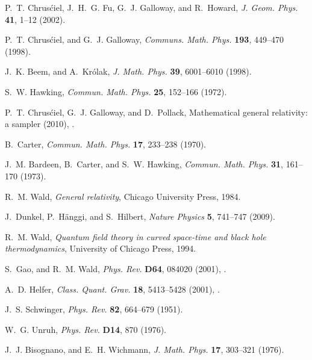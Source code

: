 \documentclass[
%
draft    %
,numberedheadings 
,bibliocites
  ]
  {aipproc}
\begin{document}
\begin{thebibliography}{57}
P.~T. Chrus\'ciel, J.~H.~G. Fu, G.~J. Galloway, and R.~Howard, \emph{J. Geom.
  Phys.} \textbf{41}, 1--12 (2002).

P.~T. Chrus\'ciel, and G.~J. Galloway, \emph{Communs. Math. Phys.}
  \textbf{193}, 449--470 (1998).

J.~K. Beem, and A.~Kr\'olak, \emph{J. Math. Phys.} \textbf{39}, 6001--6010
  (1998).

S.~W. Hawking, \emph{Commun. Math. Phys.} \textbf{25}, 152--166 (1972).

P.~T. Chrus\'ciel, G.~J. Galloway, and D.~Pollack, {Mathematical general
  relativity: a sampler} (2010), .

B.~Carter, \emph{Commun. Math. Phys.} \textbf{17}, 233--238 (1970).

J.~M. Bardeen, B.~Carter, and S.~W. Hawking, \emph{Commun. Math. Phys.}
  \textbf{31}, 161--170 (1973).

R.~M. Wald, \emph{General relativity}, Chicago University Press, 1984.

J.~Dunkel, P.~H\"anggi, and S.~Hilbert, \emph{Nature Physics} \textbf{5},
  741--747 (2009).

R.~M. Wald, \emph{Quantum field theory in curved space-time and black hole
  thermodynamics}, University of Chicago Press, 1994.

S.~Gao, and R.~M. Wald, \emph{Phys. Rev.} \textbf{D64}, 084020 (2001),
  .

A.~D. Helfer, \emph{Class. Quant. Grav.} \textbf{18}, 5413--5428 (2001),
  .

J.~S. Schwinger, \emph{Phys. Rev.} \textbf{82}, 664--679 (1951).

W.~G. Unruh, \emph{Phys. Rev.} \textbf{D14}, 870 (1976).

J.~J. Bisognano, and E.~H. Wichmann, \emph{J. Math. Phys.} \textbf{17},
  303--321 (1976).


\end{thebibliography}
\end{document}
